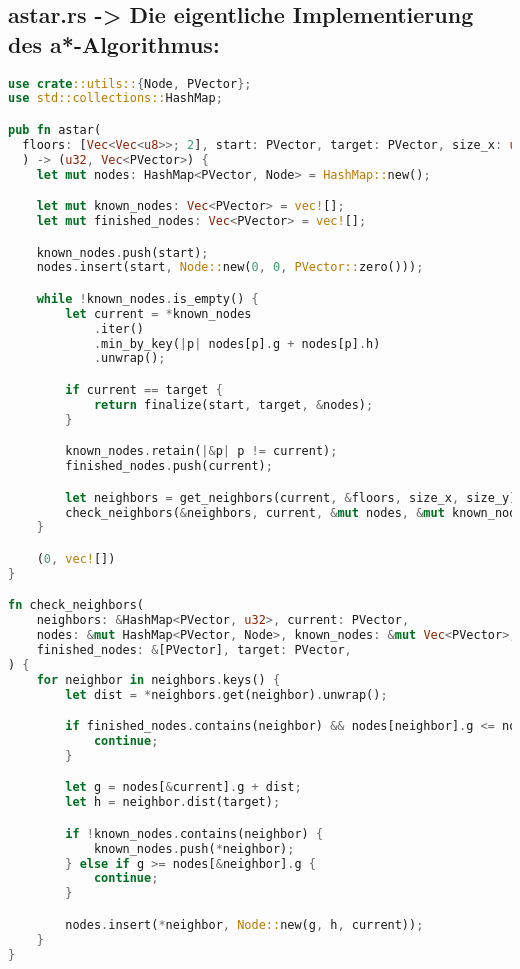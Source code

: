 \subsection{ astar.rs -> Die eigentliche Implementierung des a*-Algorithmus:}
\begin{lstlisting}[language=Rust, style=colouredRust]
use crate::utils::{Node, PVector};
use std::collections::HashMap;

pub fn astar(
  floors: [Vec<Vec<u8>>; 2], start: PVector, target: PVector, size_x: u32, size_y: u32
  ) -> (u32, Vec<PVector>) {
    let mut nodes: HashMap<PVector, Node> = HashMap::new();

    let mut known_nodes: Vec<PVector> = vec![];
    let mut finished_nodes: Vec<PVector> = vec![];

    known_nodes.push(start);
    nodes.insert(start, Node::new(0, 0, PVector::zero()));

    while !known_nodes.is_empty() {
        let current = *known_nodes
            .iter()
            .min_by_key(|p| nodes[p].g + nodes[p].h)
            .unwrap();

        if current == target {
            return finalize(start, target, &nodes);
        }

        known_nodes.retain(|&p| p != current);
        finished_nodes.push(current);

        let neighbors = get_neighbors(current, &floors, size_x, size_y);
        check_neighbors(&neighbors, current, &mut nodes, &mut known_nodes, &finished_nodes, target);
    }

    (0, vec![])
}

fn check_neighbors(
    neighbors: &HashMap<PVector, u32>, current: PVector,
    nodes: &mut HashMap<PVector, Node>, known_nodes: &mut Vec<PVector>,
    finished_nodes: &[PVector], target: PVector,
) {
    for neighbor in neighbors.keys() {
        let dist = *neighbors.get(neighbor).unwrap();

        if finished_nodes.contains(neighbor) && nodes[neighbor].g <= nodes[&current].g + dist {
            continue;
        }

        let g = nodes[&current].g + dist;
        let h = neighbor.dist(target);

        if !known_nodes.contains(neighbor) {
            known_nodes.push(*neighbor);
        } else if g >= nodes[&neighbor].g {
            continue;
        }

        nodes.insert(*neighbor, Node::new(g, h, current));
    }
}


\end{lstlisting}
